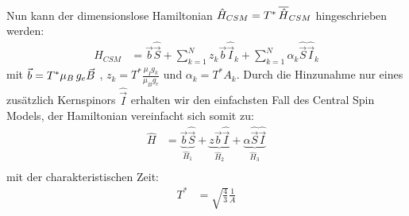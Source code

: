 Nun kann der dimensionslose Hamiltonian $\hat{H}_{CSM} = T^*\thinspace\overline{\hat{H}}_{CSM}$ hingeschrieben werden:
\begin{align}
    \hat{H}_{CSM} &= \vec{b}\hat{\vec{S}} +  \sum_{k=1}^{N}z_k\vec{b}\hat{\vec{I}}_k + \sum_{k=1}^{N} \alpha_k \hat{\vec{S}}\hat{\vec{I}}_k
\end{align}
mit $\vec{b}=T^*\mu_B\thinspace g_e \vec{B}$ , $z_k=T^*\frac{\mu_I g_k}{\mu_B g_e}$ und $\alpha_k = T^* A_k$.
\noindent Durch die Hinzunahme nur eines zusätzlich Kernspinors $\hat{\vec{I}}$ erhalten wir den einfachsten Fall des Central 
Spin Models, der Hamiltonian vereinfacht sich somit zu:
\begin{align}
    \hat{H} &= \underbrace{ \vec{b}\hat{\vec{S}}}_{\hat{H}_1} + \underbrace{z \vec{b}\hat{\vec{I}}}_{\hat{H}_2} + 
    \underbrace{\alpha \hat{\vec{S}}\hat{\vec{I}}}_{\hat{H}_3}\\
\end{align}
 mit der charakteristischen Zeit:
 \begin{align}
    T^* &= \sqrt{\frac{4}{3}}\frac{1}{A}
 \end{align}








